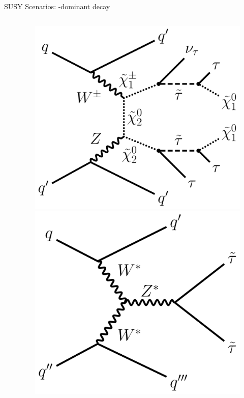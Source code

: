 \begin{frame}[fragile]{SUSY Scenarios: \PSGt-dominant decay}
\begin{columns}
\begin{column}{0.6\textwidth}
    \end{column}
    \begin{column}{0.4\textwidth}
      \begin{figure}[htpb]
        \centering
        \includegraphics[height=0.4\textheight]{fig/scenarios/FeynmanStauDominated.pdf}
        \includegraphics[height=0.4\textheight]{fig/scenarios/FeynmanDirectStau.pdf}
      \end{figure}
      
    \end{column}
  \end{columns}

\end{frame}

